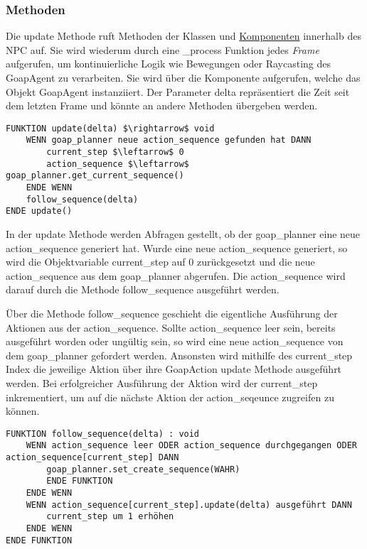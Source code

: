 \subsubsection{Methoden}

Die update Methode ruft Methoden der Klassen und \hyperref[chap:game-objects]{Komponenten} innerhalb des NPC auf. Sie wird wiederum durch eine \_process Funktion jedes \textit{Frame} aufgerufen, um kontinuierliche Logik wie Bewegungen oder Raycasting des GoapAgent zu verarbeiten. Sie wird über die Komponente aufgerufen, welche das Objekt GoapAgent instanziiert. Der Parameter delta repräsentiert die Zeit seit dem letzten Frame und könnte an andere Methoden übergeben werden.

%

\begin{lstlisting}[language=Pseudo, caption={update Methode des GoapAgent}, mathescape=true]
FUNKTION update(delta) $\rightarrow$ void
    WENN goap_planner neue action_sequence gefunden hat DANN
        current_step $\leftarrow$ 0
        action_sequence $\leftarrow$ goap_planner.get_current_sequence()
    ENDE WENN
    follow_sequence(delta)
ENDE update()
\end{lstlisting}

In der update Methode werden Abfragen gestellt, ob der goap\_planner eine neue action\_sequence generiert hat. Wurde eine neue action\_sequence generiert, so wird die Objektvariable current\_step auf $0$ zurückgesetzt und die neue action\_sequence aus dem goap\_planner abgerufen. Die action\_sequence wird darauf durch die Methode follow\_sequence ausgeführt werden.

Über die Methode follow\_sequence geschieht die eigentliche Ausführung der Aktionen aus der action\_sequence. Sollte action\_sequence leer sein, bereits ausgeführt worden oder ungültig sein, so wird eine neue action\_sequence von dem goap\_planner gefordert werden. Ansonsten wird mithilfe des current\_step Index die jeweilige Aktion über ihre GoapAction update Methode ausgeführt werden. Bei erfolgreicher Ausführung der Aktion wird der current\_step inkrementiert, um auf die nächste Aktion der action\_seqeunce zugreifen zu können.

\begin{lstlisting}[language=Pseudo, caption={follow\_sequence Methode des GoapAgent}, mathescape=true]
FUNKTION follow_sequence(delta) : void
	WENN action_sequence leer ODER action_sequence durchgegangen ODER action_sequence[current_step] DANN
		goap_planner.set_create_sequence(WAHR)
		ENDE FUNKTION
	ENDE WENN
	WENN action_sequence[current_step].update(delta) ausgeführt DANN
		current_step um 1 erhöhen
	ENDE WENN
ENDE FUNKTION
\end{lstlisting}




